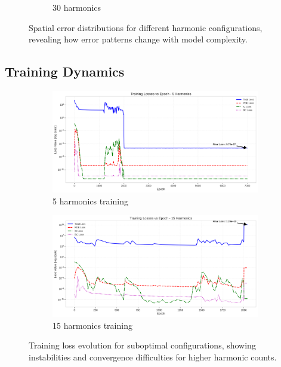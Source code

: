 \begin{figure}[H]
\begin{subfigure}[b]{0.32\textwidth}
        \caption{30 harmonics}
    \end{subfigure}
    \caption{Spatial error distributions for different harmonic configurations, revealing how error patterns change with model complexity.}
    \label{fig:error_dist_comparison}
\end{figure}

\subsection{Training Dynamics}

\begin{figure}[H]
    \centering
    \begin{subfigure}[b]{0.48\textwidth}
        \centering
        \includegraphics[width=\textwidth]{figures/training_losses_5h.png}
        \caption{5 harmonics training}
    \end{subfigure}
    \hfill
    \begin{subfigure}[b]{0.48\textwidth}
        \centering
        \includegraphics[width=\textwidth]{figures/training_losses_15h.png}
        \caption{15 harmonics training}
    \end{subfigure}
    \caption{Training loss evolution for suboptimal configurations, showing instabilities and convergence difficulties for higher harmonic counts.}
    \label{fig:training_comparison}
\end{figure}

